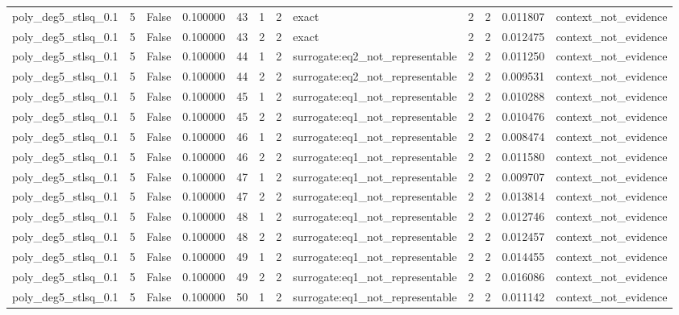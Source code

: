 \begin{tabular}{lrrrrrrlrrrl}
poly\_deg5\_stlsq\_0.1 & 5 & False & 0.100000 & 43 & 1 & 2 & exact & 2 & 2 & 0.011807 & context\_not\_evidence \\
poly\_deg5\_stlsq\_0.1 & 5 & False & 0.100000 & 43 & 2 & 2 & exact & 2 & 2 & 0.012475 & context\_not\_evidence \\
poly\_deg5\_stlsq\_0.1 & 5 & False & 0.100000 & 44 & 1 & 2 & surrogate:eq2\_not\_representable & 2 & 2 & 0.011250 & context\_not\_evidence \\
poly\_deg5\_stlsq\_0.1 & 5 & False & 0.100000 & 44 & 2 & 2 & surrogate:eq2\_not\_representable & 2 & 2 & 0.009531 & context\_not\_evidence \\
poly\_deg5\_stlsq\_0.1 & 5 & False & 0.100000 & 45 & 1 & 2 & surrogate:eq1\_not\_representable & 2 & 2 & 0.010288 & context\_not\_evidence \\
poly\_deg5\_stlsq\_0.1 & 5 & False & 0.100000 & 45 & 2 & 2 & surrogate:eq1\_not\_representable & 2 & 2 & 0.010476 & context\_not\_evidence \\
poly\_deg5\_stlsq\_0.1 & 5 & False & 0.100000 & 46 & 1 & 2 & surrogate:eq1\_not\_representable & 2 & 2 & 0.008474 & context\_not\_evidence \\
poly\_deg5\_stlsq\_0.1 & 5 & False & 0.100000 & 46 & 2 & 2 & surrogate:eq1\_not\_representable & 2 & 2 & 0.011580 & context\_not\_evidence \\
poly\_deg5\_stlsq\_0.1 & 5 & False & 0.100000 & 47 & 1 & 2 & surrogate:eq1\_not\_representable & 2 & 2 & 0.009707 & context\_not\_evidence \\
poly\_deg5\_stlsq\_0.1 & 5 & False & 0.100000 & 47 & 2 & 2 & surrogate:eq1\_not\_representable & 2 & 2 & 0.013814 & context\_not\_evidence \\
poly\_deg5\_stlsq\_0.1 & 5 & False & 0.100000 & 48 & 1 & 2 & surrogate:eq1\_not\_representable & 2 & 2 & 0.012746 & context\_not\_evidence \\
poly\_deg5\_stlsq\_0.1 & 5 & False & 0.100000 & 48 & 2 & 2 & surrogate:eq1\_not\_representable & 2 & 2 & 0.012457 & context\_not\_evidence \\
poly\_deg5\_stlsq\_0.1 & 5 & False & 0.100000 & 49 & 1 & 2 & surrogate:eq1\_not\_representable & 2 & 2 & 0.014455 & context\_not\_evidence \\
poly\_deg5\_stlsq\_0.1 & 5 & False & 0.100000 & 49 & 2 & 2 & surrogate:eq1\_not\_representable & 2 & 2 & 0.016086 & context\_not\_evidence \\
poly\_deg5\_stlsq\_0.1 & 5 & False & 0.100000 & 50 & 1 & 2 & surrogate:eq1\_not\_representable & 2 & 2 & 0.011142 & context\_not\_evidence \\

\end{tabular}
